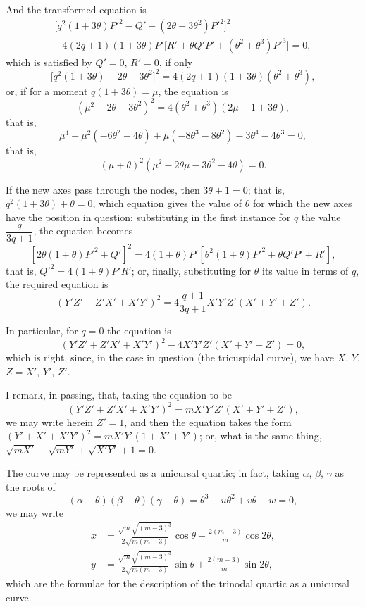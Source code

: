 \documentclass[12pt,a4paper]{article}
\theoremstyle{plain}
\theoremstyle{definition}
\begin{document}
And the transformed equation is
\begin{multline*}
\bigl[q^2(1 + 3\theta)P'^2 - Q' - (2\theta + 3\theta^2)P'^2\bigr]^2 \\
- 4(2q + 1)(1 + 3\theta)P'\bigl[R' + \theta Q'P' + (\theta^2 + \theta^3)P'^3\bigr] = 0,
\end{multline*}
which is satisfied by $Q' = 0$, $R' = 0$, if only
\[
\bigl[q^2(1 + 3\theta) - 2\theta - 3\theta^2\bigr]^2 = 4(2q + 1)(1 + 3\theta)(\theta^2 + \theta^3),
\]
or, if for a moment $q(1 + 3\theta) = \mu$, the equation is
\[
(\mu^2 - 2\theta - 3\theta^2)^2 = 4(\theta^2 + \theta^3)(2\mu + 1 + 3\theta),
\]
that is,
\[
\mu^4 + \mu^2(-6\theta^2 - 4\theta) + \mu(-8\theta^3 - 8\theta^2) - 3\theta^4 - 4\theta^3 = 0,
\]
that is,
\[
(\mu + \theta)^2(\mu^2 - 2\theta\mu - 3\theta^2 - 4\theta) = 0.
\]

If the new axes pass through the nodes, then $3\theta + 1 = 0$; that is, $q^2(1 + 3\theta) + \theta = 0$, which equation gives the value of $\theta$ for which the new axes have the position in question; substituting in the first instance for $q$ the value $\dfrac{q}{3q+1}$, the equation becomes
\[
[2\theta(1 + \theta)P'^2 + Q']^2 = 4(1 + \theta)P'[\theta^2(1 + \theta)P'^2 + \theta Q'P' + R'],
\]
that is, $Q'^2 = 4(1 + \theta)P'R'$; or, finally, substituting for $\theta$ its value in terms of $q$, the required equation is
\[
(Y'Z' + Z'X' + X'Y')^2 = 4\frac{q+1}{3q+1}X'Y'Z'(X' + Y' + Z').
\]

In particular, for $q = 0$ the equation is
\[
(Y'Z' + Z'X' + X'Y')^2 - 4X'Y'Z'(X' + Y' + Z') = 0,
\]
which is right, since, in the case in question (the tricuspidal curve), we have $X$, $Y$, $Z = X'$, $Y'$, $Z'$.

I remark, in passing, that, taking the equation to be
\[
(Y'Z' + Z'X' + X'Y')^2 = mX'Y'Z'(X' + Y' + Z'),
\]
we may write herein $Z' = 1$, and then the equation takes the form $(Y' + X' + X'Y')^2 = mX'Y'(1 + X' + Y')$; or, what is the same thing, $\sqrt{mX'} + \sqrt{mY'} + \sqrt{X'Y'} + 1 = 0$.

\newpage
\setcounter{page}{6}

The curve may be represented as a unicursal quartic; in fact, taking $\alpha$, $\beta$, $\gamma$ as the roots of
\[
(\alpha - \theta)(\beta - \theta)(\gamma - \theta) = \theta^3 - u\theta^2 + v\theta - w = 0,
\]
we may write
\begin{align*}
x &= \frac{\sqrt{m}\sqrt{(m - 3)^3}}{2\sqrt{m(m - 3)}}\cos \theta + \frac{2(m - 3)}{m}\cos 2\theta,\\
y &= \frac{\sqrt{m}\sqrt{(m - 3)^3}}{2\sqrt{m(m - 3)}}\sin \theta + \frac{2(m - 3)}{m}\sin 2\theta,
\end{align*}
which are the formulae for the description of the trinodal quartic as a unicursal curve.
\end{document}
